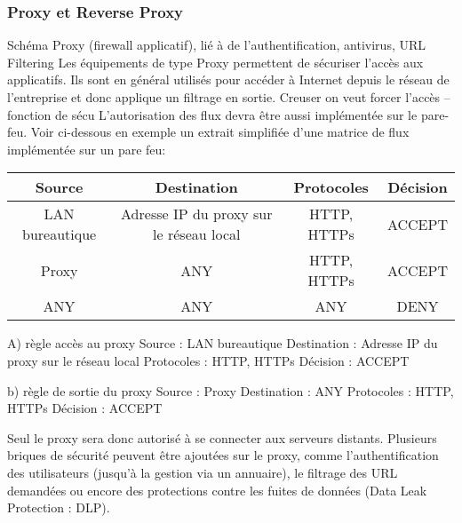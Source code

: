 \subsubsection{Proxy et Reverse Proxy}
Schéma Proxy (firewall applicatif), lié à de l’authentification, antivirus, URL Filtering
Les équipements de type Proxy permettent de sécuriser l'accès aux applicatifs.
Ils sont en général utilisés pour accéder à Internet depuis le réseau de l'entreprise et donc applique un filtrage en sortie.
Creuser on veut forcer l'accès -- fonction de sécu
L'autorisation des flux devra être aussi implémentée sur le pare-feu.
Voir ci-dessous en exemple un extrait simplifiée d'une matrice de flux implémentée sur un pare feu:

\begin{center}
\begin{tabular}{||c c c c||} 
 \hline
 Source & Destination & Protocoles & Décision \\ [0.5ex] 
 \hline\hline
 LAN bureautique & Adresse IP du proxy sur le réseau local & HTTP, HTTPs & ACCEPT \\ 
 \hline
 Proxy & ANY & HTTP, HTTPs & ACCEPT \\
 \hline
 ANY & ANY & ANY & DENY \\
 \hline
\end{tabular}
\end{center}

A) règle accès au proxy
Source : LAN bureautique
Destination : Adresse IP du proxy sur le réseau local
Protocoles : HTTP, HTTPs
Décision : ACCEPT

b) règle de sortie du proxy
Source : Proxy
Destination : ANY
Protocoles : HTTP, HTTPs
Décision : ACCEPT

Seul le proxy sera donc autorisé à se connecter aux serveurs distants.
Plusieurs briques de sécurité peuvent être ajoutées sur le proxy, comme l'authentification des utilisateurs (jusqu'à la gestion via un annuaire), le filtrage des URL demandées ou encore des protections contre les fuites de données (Data Leak Protection : DLP).


